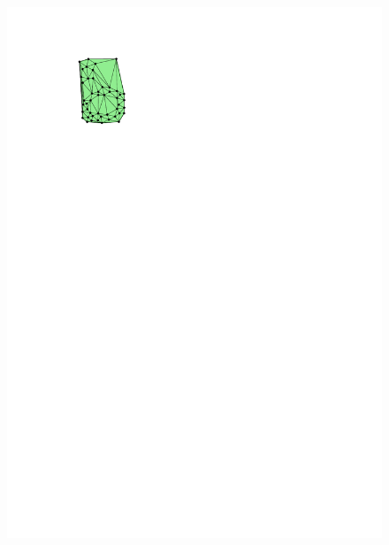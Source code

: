 \begin{marginfigure}
\begin{subfigure}[b]{0.6\linewidth}
    \includegraphics[page=2,width=\textwidth]{figs/chishape.pdf}
    \caption{}
  \end{subfigure}
  \qquad 
  \begin{subfigure}[b]{0.6\linewidth}
    \centering

\end{subfigure}
\end{marginfigure}
